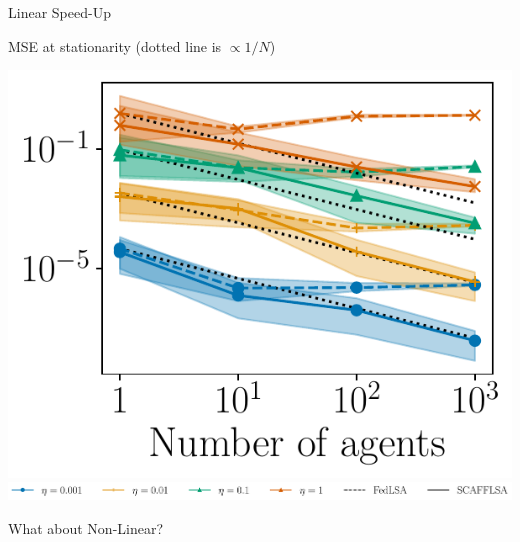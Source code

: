 \documentclass[aspectratio=169,14pt]{beamer}
\begin{document}
  \begin{frame}{Linear Speed-Up}
  \vspace{-0.5em}

  MSE at stationarity (dotted line is $\propto 1/N$)

  \vspace{-1em}
  
  \begin{center}   
    \includegraphics[width=0.5\linewidth]{images/linear-speedup.pdf}
    \includegraphics[width=\linewidth]{images/legend.pdf}

    \vspace{-1.5em}

  \end{center}

\end{frame}

  
  


  
  \begin{frame}
    \begin{center}
      \textcolor{beamer@blendedblue}{
        \huge What about Non-Linear?
      }
    \end{center}
  \end{frame}
\end{document}
